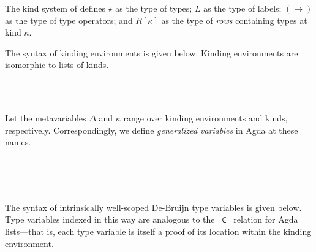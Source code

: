 \documentclass[authoryear, acmsmall, screen, review, nonacm]{acmart}
\begin{document}
The kind system of \Rome defines $\star$ as the type of types; $L$ as the type of labels; $(\to)$ as the type of type operators; and $R[\kappa]$ as the type of \emph{rows} containing types at kind $\kappa$.

The syntax of kinding environments is given below. Kinding environments are isomorphic to lists of kinds.

\begin{code}%
\>[0]\AgdaSpace{}%
\AgdaSpace{}%
\AgdaSymbol{:}\AgdaSpace{}%
\AgdaSpace{}%
\<%
\\
\>[0][@{}l@{\AgdaIndent{0}}]%
\>[2]\AgdaSpace{}%
\AgdaSymbol{:}\AgdaSpace{}%
\<%
\\
%
\>[2]\AgdaOperator{\AgdaInductiveConstructor{\AgdaUnderscore{},,\AgdaUnderscore{}}}\AgdaSpace{}%
\AgdaSymbol{:}\AgdaSpace{}%
\AgdaSpace{}%
\AgdaSpace{}%
\AgdaSpace{}%
\AgdaSpace{}%
\<%
\end{code}

Let the metavariables $\Delta$ and $\kappa$ range over kinding environments and kinds, respectively. Correspondingly, we define \emph{generalized variables} in Agda at these names. 

\begin{code}%
\>[0]\<%
\\
\>[0][@{}l@{\AgdaIndent{0}}]%
\>[2]\<%
\\
\>[2][@{}l@{\AgdaIndent{0}}]%
\>[4]\AgdaSpace{}%
\AgdaSpace{}%
\AgdaSpace{}%
\AgdaSpace{}%
\AgdaSymbol{:}\AgdaSpace{}%
\<%
\\
%
\>[4]\AgdaSpace{}%
\AgdaSpace{}%
\AgdaSpace{}%
\AgdaSymbol{:}\AgdaSpace{}%
\<%
\end{code}

The syntax of intrinsically well-scoped De-Bruijn type variables is given below. Type variables indexed in this way are analogous to the \verb!_∈_! relation for Agda lists---that is, each type variable is itself a proof of its location within the kinding environment.
\end{document}
